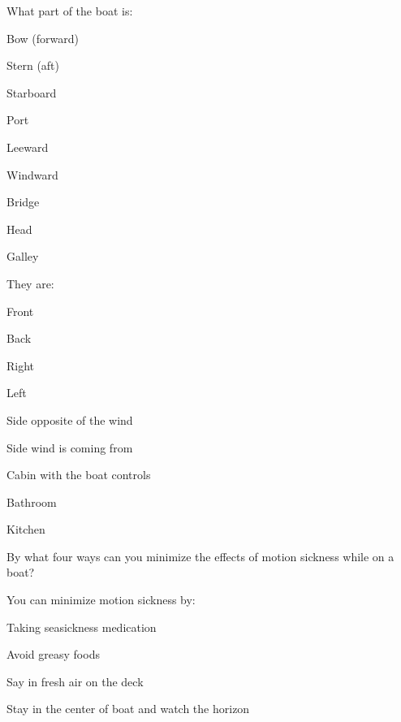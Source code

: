 	\begin{qanda}
		\begin{question}
What part of the boat is:
			\begin{nospacenumberedlist}
				\item Bow (forward)
				\item Stern (aft)
				\item Starboard
				\item Port
				\item Leeward
				\item Windward
				\item Bridge
				\item Head
				\item Galley
			\end{nospacenumberedlist}
		\end{question}

		\begin{answer}
They are:
			\begin{nospacenumberedlist}
				\item Front
				\item Back
				\item Right
				\item Left
				\item Side opposite of the wind
				\item Side wind is coming from
				\item Cabin with the boat controls
				\item Bathroom
				\item Kitchen
			\end{nospacenumberedlist}
		\end{answer}
	\end{qanda}

	\begin{qanda}
		\begin{question}
By what four ways can you minimize the effects of motion sickness while on a boat?
		\end{question}

		\begin{answer}
You can minimize motion sickness by:
			\begin{nospacebulletedlist}
						\item Taking seasickness medication
						\item Avoid greasy foods
						\item Say in fresh air on the deck
						\item Stay in the center of boat and watch the horizon
			\end{nospacebulletedlist}
		\end{answer}
	\end{qanda}

